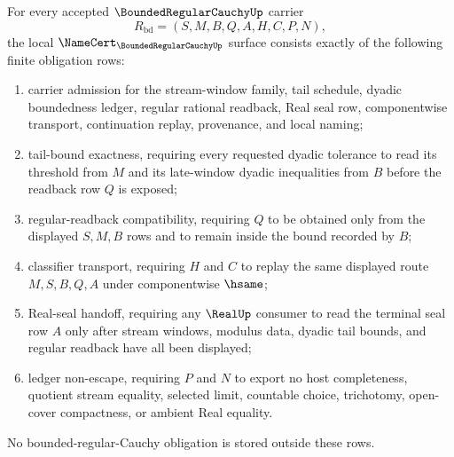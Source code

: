 \begin{theorem}
\label{thm:bounded-regular-cauchy-obligation-surface}
For every accepted $\BoundedRegularCauchyUp$ carrier
$$
R_{\mathrm{bd}}=(S,M,B,Q,A,H,C,P,N),
$$
the local $\NameCert_{\BoundedRegularCauchyUp}$ surface consists exactly of the following finite obligation rows:
\begin{enumerate}
\item carrier admission for the stream-window family, tail schedule, dyadic boundedness ledger, regular rational readback, Real seal row, componentwise transport, continuation replay, provenance, and local naming;
\item tail-bound exactness, requiring every requested dyadic tolerance to read its threshold from $M$ and its late-window dyadic inequalities from $B$ before the readback row $Q$ is exposed;
\item regular-readback compatibility, requiring $Q$ to be obtained only from the displayed $S,M,B$ rows and to remain inside the bound recorded by $B$;
\item classifier transport, requiring $H$ and $C$ to replay the same displayed route $M,S,B,Q,A$ under componentwise $\hsame$;
\item Real-seal handoff, requiring any $\RealUp$ consumer to read the terminal seal row $A$ only after stream windows, modulus data, dyadic tail bounds, and regular readback have all been displayed;
\item ledger non-escape, requiring $P$ and $N$ to export no host completeness, quotient stream equality, selected limit, countable choice, trichotomy, open-cover compactness, or ambient Real equality.
\end{enumerate}
No bounded-regular-Cauchy obligation is stored outside these rows.
\end{theorem}
